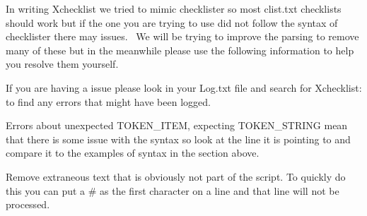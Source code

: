 \documentclass[11pt,parskip=half,a4paper]{scrartcl}
\begin{document}
In writing Xchecklist we tried to mimic checklister so most clist.txt checklists should work but if the one you are trying to use did not follow the syntax of checklister there may issues. \ We will be trying to improve the parsing to remove many of these but in the meanwhile please use the following information to help you resolve them yourself. \ 

If you are having a issue please look in your Log.txt file and search for Xchecklist: to find any errors that might have been logged.

Errors about {\textquotedbl}unexpected TOKEN\_ITEM, expecting TOKEN\_STRING{\textquotedbl} mean that there is some issue with the syntax so look at the line it is pointing to and compare it to the examples of syntax in the section above.

Remove extraneous text that is obviously not part of the script. To quickly do this you can put a \# as the first character on a line and that line will not be processed.
\end{document}
